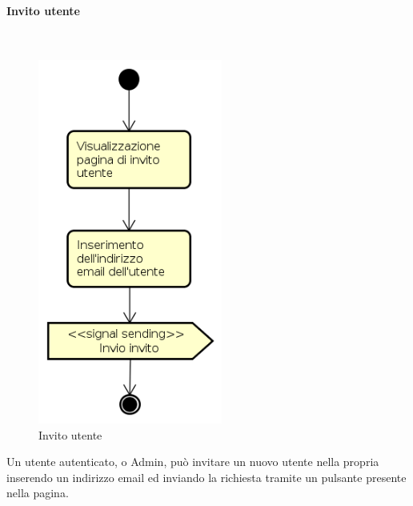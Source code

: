 \paragraph{Invito utente} \mbox{} \\
\begin{figure}[H]
\begin{center}
\includegraphics[height=12cm]{res/sections/backend/activities/invitoUtente.png}
\caption{Invito utente}
\end{center}
\end{figure}
Un utente autenticato,  o Admin, può invitare un nuovo utente nella propria  inserendo un indirizzo email ed inviando la richiesta tramite un pulsante presente nella pagina.
\newpage
